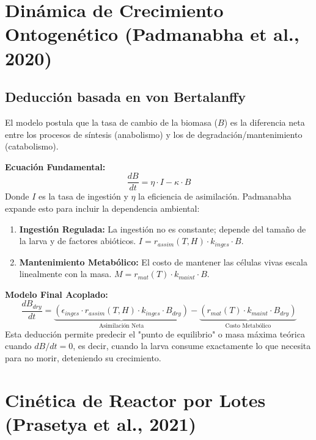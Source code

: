 \documentclass{article}
\begin{document}
\section{Dinámica de Crecimiento Ontogenético (Padmanabha et al., 2020)}

\subsection{Deducción basada en von Bertalanffy}
El modelo postula que la tasa de cambio de la biomasa ($B$) es la diferencia neta entre los procesos de síntesis (anabolismo) y los de degradación/mantenimiento (catabolismo).

\textbf{Ecuación Fundamental:}
\begin{equation}
    \frac{dB}{dt} = \eta \cdot I - \kappa \cdot B
\end{equation}
Donde $I$ es la tasa de ingestión y $\eta$ la eficiencia de asimilación. Padmanabha expande esto para incluir la dependencia ambiental:
\begin{enumerate}
    \item \textbf{Ingestión Regulada:} La ingestión no es constante; depende del tamaño de la larva y de factores abióticos. $I = r_{assim}(T, H) \cdot k_{inges} \cdot B$.
    \item \textbf{Mantenimiento Metabólico:} El costo de mantener las células vivas escala linealmente con la masa. $M = r_{mat}(T) \cdot k_{maint} \cdot B$.
\end{enumerate}

\textbf{Modelo Final Acoplado:}
\begin{equation}
    \frac{dB_{dry}}{dt} = \underbrace{\left( \epsilon_{inges} \cdot r_{assim}(T, H) \cdot k_{inges} \cdot B_{dry} \right)}_{\text{Asimilación Neta}} - \underbrace{\left( r_{mat}(T) \cdot k_{maint} \cdot B_{dry} \right)}_{\text{Costo Metabólico}}
\end{equation}
Esta deducción permite predecir el "punto de equilibrio" o masa máxima teórica cuando $dB/dt = 0$, es decir, cuando la larva consume exactamente lo que necesita para no morir, deteniendo su crecimiento.



\section{Cinética de Reactor por Lotes (Prasetya et al., 2021)}
\end{document}

